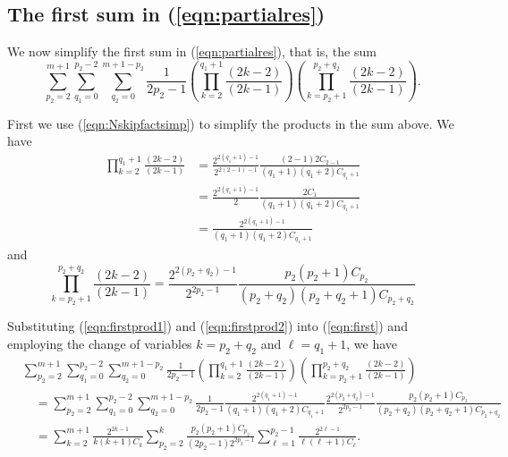 \documentclass[11pt]{article}
\theoremstyle{definition}
\theoremstyle{definition}
\theoremstyle{plain}
\theoremstyle{plain}
\theoremstyle{plain}
\theoremstyle{definition}
\theoremstyle{definition}
\begin{document}
{\subsection*{The first sum in (\ref{eqn:partialres})}

We now simplify the first sum in (\ref{eqn:partialres}), that is, the sum
\begin{equation}\label{eqn:first}
\sum\limits_{p_2=2}^{m+1}\sum\limits_{q_1=0}^{p_2-2}\sum\limits_{q_2=0}^{m+1-p_2}\frac{1}{2p_2-1}\left(\prod\limits_{k=2}^{q_1+1}\frac{(2k-2)}{(2k-1)}\right)\left(\prod\limits_{k=p_2+1}^{p_2+q_2}\frac{(2k-2)}{(2k-1)}\right).
\end{equation}

First we use (\ref{eqn:Nskipfactsimp}) to simplify the products in the sum above. We have
\begin{equation}\label{eqn:firstprod1}
\begin{aligned}
\prod\limits_{k=2}^{q_1+1}\frac{(2k-2)}{(2k-1)} &= \frac{2^{2(q_1+1)-1}}{2^{2(2-1)-1}}\frac{(2-1)2C_{2-1}}{(q_1+1)(q_1+2)C_{q_1+1}} \\
&= \frac{2^{2(q_1+1)-1}}{2}\frac{2C_{1}}{(q_1+1)(q_1+2)C_{q_1+1}} \\
&= \frac{2^{2(q_1+1)-1}}{(q_1+1)(q_1+2)C_{q_1+1}}
\end{aligned}
\end{equation}
and
\begin{equation}\label{eqn:firstprod2}
\prod\limits_{k=p_2+1}^{p_2+q_2}\frac{(2k-2)}{(2k-1)} = \frac{2^{2(p_2+q_2)-1}}{2^{2p_2-1}}\frac{p_2(p_2+1)C_{p_2}}{(p_2+q_2)(p_2+q_2+1)C_{p_2+q_2}}
\end{equation}

Substituting (\ref{eqn:firstprod1}) and (\ref{eqn:firstprod2}) into (\ref{eqn:first}) and employing the change of variables $k = p_2+q_2$ and $\ell = q_1+1$, we have
\begin{equation}\label{eqn:firstseparated}
\begin{aligned}
&\sum\limits_{p_2=2}^{m+1}\sum\limits_{q_1=0}^{p_2-2}\sum\limits_{q_2=0}^{m+1-p_2}\frac{1}{2p_2-1}\left(\prod\limits_{k=2}^{q_1+1}\frac{(2k-2)}{(2k-1)}\right)\left(\prod\limits_{k=p_2+1}^{p_2+q_2}\frac{(2k-2)}{(2k-1)}\right)\\
&\quad = \sum\limits_{p_2=2}^{m+1}\sum\limits_{q_1=0}^{p_2-2}\sum\limits_{q_2=0}^{m+1-p_2}\frac{1}{2p_2-1}\frac{2^{2(q_1+1)-1}}{(q_1+1)(q_1+2)C_{q_1+1}}\frac{2^{2(p_2+q_2)-1}}{2^{2p_2-1}}\frac{p_2(p_2+1)C_{p_2}}{(p_2+q_2)(p_2+q_2+1)C_{p_2+q_2}} \\
&\quad = \sum\limits_{k=2}^{m+1}\frac{2^{2k-1}}{k(k+1)C_k}\sum\limits_{p_2=2}^k\frac{p_2(p_2+1)C_{p_2}}{(2p_2-1)2^{2p_2-1}}\sum\limits_{\ell=1}^{p_2-1}\frac{2^{2\ell-1}}{\ell(\ell+1)C_\ell}.
\end{aligned}
\end{equation}

}
\end{document}
